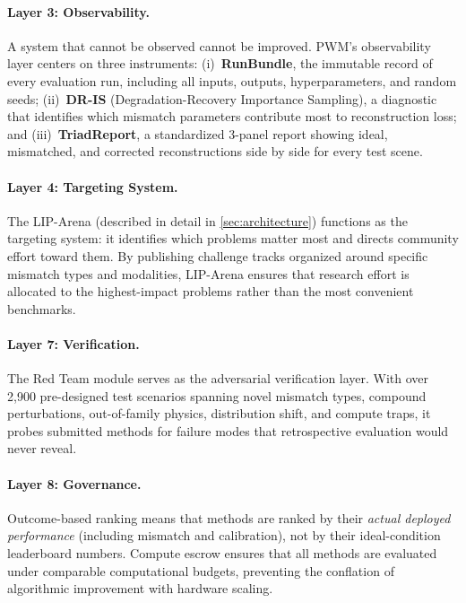\paragraph{Layer 3: Observability.}
A system that cannot be observed cannot be improved.
PWM's observability layer centers on three instruments:
(i)~\textbf{RunBundle}, the immutable record of every evaluation run,
including all inputs, outputs, hyperparameters, and random seeds;
(ii)~\textbf{DR-IS} (Degradation-Recovery Importance Sampling), a
diagnostic that identifies which mismatch parameters contribute most to
reconstruction loss; and
(iii)~\textbf{TriadReport}, a standardized 3-panel report showing
ideal, mismatched, and corrected reconstructions side by side for every
test scene.

\paragraph{Layer 4: Targeting System.}
The LIP-Arena (described in detail in \cref{sec:architecture})
functions as the targeting system: it identifies which problems
matter most and directs community effort toward them.
By publishing challenge tracks organized around specific mismatch
types and modalities, LIP-Arena ensures that research effort is
allocated to the highest-impact problems rather than the most
convenient benchmarks.

\paragraph{Layer 7: Verification.}
The Red Team module serves as the adversarial verification layer.
With over 2{,}900 pre-designed test scenarios spanning novel mismatch
types, compound perturbations, out-of-family physics, distribution
shift, and compute traps, it probes submitted methods for failure modes
that retrospective evaluation would never reveal.

\paragraph{Layer 8: Governance.}
Outcome-based ranking means that methods are ranked by their
\emph{actual deployed performance} (including mismatch and calibration),
not by their ideal-condition leaderboard numbers.
Compute escrow ensures that all methods are evaluated under comparable
computational budgets, preventing the conflation of algorithmic
improvement with hardware scaling.


